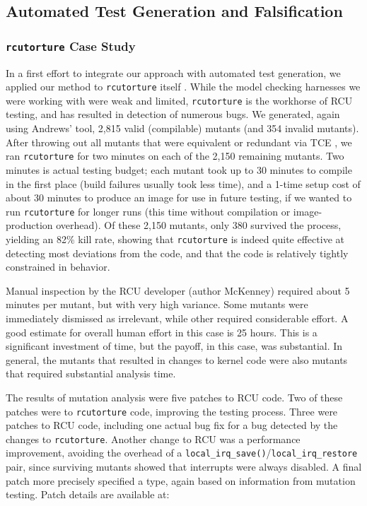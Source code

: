 \documentclass{svjour3}
\begin{document}
\subsection{Automated Test Generation and Falsification}

\subsubsection {{\tt rcutorture} Case Study}

In a first effort to integrate our approach with automated test generation, we applied our method to {\tt rcutorture} \cite{rcutorture}
itself \cite{mutKernel}.  While the model checking harnesses we were working with were
weak and limited, {\tt rcutorture} is the workhorse of RCU testing,
and has resulted in detection of numerous bugs.  We generated, again
using Andrews' tool, 2,815 valid (compilable) mutants (and 354 invalid
mutants).  After throwing out
all mutants that were equivalent or
redundant via TCE \cite{TCE}, we ran {\tt rcutorture} for two minutes
on each of the 2,150
remaining mutants.  Two minutes is actual testing
budget; each mutant took up to 30 minutes to compile in the first
place (build failures usually took less time), and a
1-time setup cost of about 30 minutes to produce an image for use in
future testing, if we wanted to run {\tt rcutorture} for longer runs
(this time without compilation or image-production overhead).
Of these 2,150 mutants, only 380 survived the process, yielding an
82\% kill rate, showing
that {\tt rcutorture} is indeed quite effective at detecting most
deviations from the code, and that the code is relatively tightly
constrained in behavior.

Manual inspection by the RCU developer (author McKenney) required
about 5 minutes per mutant, but with very high variance.  Some mutants were
immediately dismissed as irrelevant, while other required considerable
effort.  A good estimate for overall human effort in this case is 25
hours.  This is a significant investment of time, but the payoff, in
this case, was substantial.  In general, the mutants that resulted in
changes to kernel code were also mutants that required substantial
analysis time.

The results of mutation analysis were five patches to RCU code.  Two
of these patches were to {\tt rcutorture} code, improving the testing
process.  Three were patches to RCU code, including one actual bug
fix for a bug detected by the changes to {\tt rcutorture}.  Another
change to RCU was a performance improvement, avoiding the overhead of
a {\tt local\_irq\_save()}/{\tt local\_irq\_restore} pair, since
surviving mutants showed that interrupts were always disabled.  A
final patch more precisely specified a type, again based on
information from mutation testing.  Patch details are available at:
\end{document}

